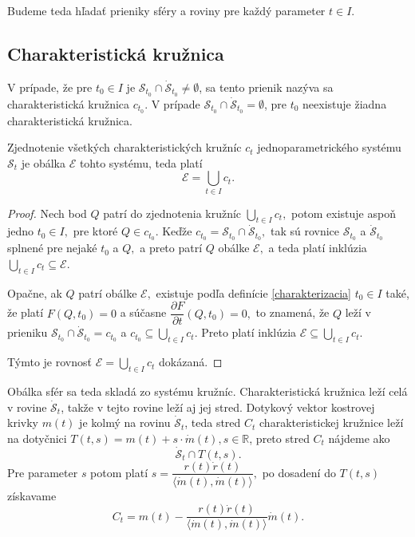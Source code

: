 Budeme teda hľadať prieniky sféry a roviny pre každý parameter $t \in I$.

\subsection{Charakteristická kružnica}
\begin{definition}
V prípade, že pre $t_0 \in I$ je $\mathcal{S}_{t_0} \cap \mathcal{\dot{S}}_{t_0} \neq \emptyset$, sa tento prienik nazýva sa charakteristická kružnica $c_{t_0}$. V prípade $\mathcal{S}_{t_0} \cap \mathcal{\dot{S}}_{t_0} = \emptyset$, pre \(t_0\) neexistuje žiadna charakteristická kružnica.
\end{definition}

\begin{lemma} \label{lema o zjednoteni charakteristickych kruznic}
Zjednotenie všetkých charakteristických kružníc $c_t$ jednoparametrického systému $\mathcal{S}_t$ je obálka $\mathcal{E}$ tohto systému, teda platí $$\mathcal{E} = \bigcup_{t \in I} c_t.$$
\end{lemma}

\begin{proof}
Nech bod $Q$ patrí do zjednotenia kružníc $ \bigcup_{t \in I} c_t, $ potom existuje aspoň jedno $t_0 \in I, $ pre ktoré $Q \in c_{t_0}.$ Keďže $c_{t_0} = \mathcal{S}_{t_0} \cap \mathcal{\dot{S}}_{t_0}, $ tak sú rovnice $\mathcal{S}_{t_0} $ a $ \mathcal{\dot{S}}_{t_0}$ splnené pre nejaké $t_0$ a $Q,$ a preto patrí $Q$ obálke $\mathcal{E}, $ a teda platí inklúzia $\bigcup_{t \in I} c_t \subseteq \mathcal{E}. $

Opačne, ak $Q$ patrí obálke $\mathcal{E},$ existuje podľa definície \ref{charakterizacia} $t_0 \in I $ také, že platí $F(Q,t_0) = 0$ a súčasne $\dfrac{\partial F}{\partial t}(Q, t_0)=0,$ to znamená, že $Q$ leží v prieniku $\mathcal{S}_{t_0} \cap \mathcal{\dot{S}}_{t_0} = c_{t_0} $ a $c_{t_0} \subseteq \bigcup_{t \in I} c_t. $ Preto platí inklúzia $\mathcal{E} \subseteq \bigcup_{t \in I} c_t.$ 

Týmto je rovnosť $\mathcal{E} = \bigcup_{t \in I} c_t$ dokázaná.
\end{proof}

Obálka sfér sa teda skladá zo systému kružníc. Charakteristická kružnica leží celá v rovine $\mathcal{\dot{S}}_t $, takže v tejto rovine leží aj jej stred. Dotykový vektor kostrovej krivky $m(t)$ je kolmý na rovinu $\mathcal{\dot{S}}_t$, teda stred $C_t$ charakteristickej kružnice leží na dotyčnici $T(t, s)= m(t) + s \cdot \dot{m}(t), s \in \mathbb{R}$, preto stred $C_t$ nájdeme ako
$$ \mathcal{\dot{S}}_t \cap T(t, s).$$
Pre parameter $s$ potom platí $s = \dfrac{r(t) \dot{r}(t)}{\langle \dot{m}(t), \dot{m}(t) \rangle }, $
po dosadení do $T(t, s)$ získavame
\begin{equation}
\label{eq:stred charakteristickej kruznice}
C_t = m(t) - \frac{r(t) \dot{r}(t)}{\langle \dot{m}(t), \dot{m}(t) \rangle} \dot{m}(t).
\end{equation}


